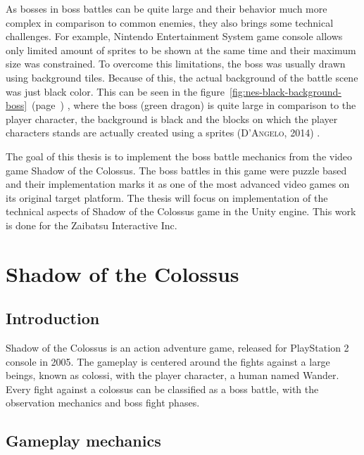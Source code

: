 \documentclass[a4paper]{article}
\newcommand{\reffigure}[1]
{
	figure~\ref{fig:#1}~(page~\pageref{fig:#1})%
}
\newcommand{\rref}[2]
{
	(\textsc{#1, #2})%
}
\begin{document}
As bosses in boss battles can be quite large and their behavior much more complex in comparison to common enemies, they also brings some technical challenges. For example, Nintendo Entertainment System game console allows only limited amount of sprites to be shown at the same time and their maximum size was constrained. To overcome this limitations, the boss was usually drawn using background tiles. Because of this, the actual background of the battle scene was just black color. This can be seen in the \reffigure{nes-black-background-boss}, where the boss (green dragon) is quite large in comparison to the player character, the background is black and the blocks on which the player characters stands are actually created using a sprites \rref{D'Angelo}{2014}.

The goal of this thesis is to implement the boss battle mechanics from the video game Shadow of the Colossus. The boss battles in this game were puzzle based and their implementation marks it as one of the most advanced video games on its original target platform. The thesis will focus on implementation of the technical aspects of Shadow of the Colossus game in the Unity engine. This work is done for the Zaibatsu Interactive Inc. 

\section{Shadow of the Colossus}

\subsection{Introduction}

Shadow of the Colossus is an action adventure game, released for PlayStation 2 console in 2005. The gameplay is centered around the fights against a large beings, known as colossi, with the player character, a human named Wander. Every fight against a colossus can be classified as a boss battle, with the observation mechanics and boss fight phases.

\subsection{Gameplay mechanics}
\end{document}
